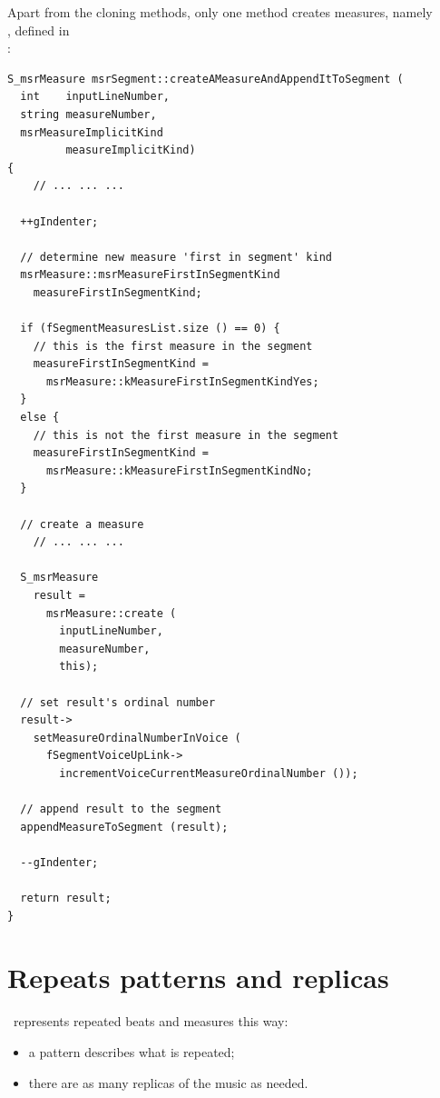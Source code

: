 Apart from the cloning methods, only one method creates measures, namely\\
, defined in\\
:
\begin{lstlisting}[language=CPlusPlus]
S_msrMeasure msrSegment::createAMeasureAndAppendItToSegment (
  int    inputLineNumber,
  string measureNumber,
  msrMeasureImplicitKind
         measureImplicitKind)
{
	// ... ... ...

  ++gIndenter;

  // determine new measure 'first in segment' kind
  msrMeasure::msrMeasureFirstInSegmentKind
    measureFirstInSegmentKind;

  if (fSegmentMeasuresList.size () == 0) {
    // this is the first measure in the segment
    measureFirstInSegmentKind =
      msrMeasure::kMeasureFirstInSegmentKindYes;
  }
  else {
    // this is not the first measure in the segment
    measureFirstInSegmentKind =
      msrMeasure::kMeasureFirstInSegmentKindNo;
  }

  // create a measure
	// ... ... ...

  S_msrMeasure
    result =
      msrMeasure::create (
        inputLineNumber,
        measureNumber,
        this);

  // set result's ordinal number
  result->
    setMeasureOrdinalNumberInVoice (
      fSegmentVoiceUpLink->
        incrementVoiceCurrentMeasureOrdinalNumber ());

  // append result to the segment
  appendMeasureToSegment (result);

  --gIndenter;

  return result;
}
\end{lstlisting}


\section{Repeats patterns and replicas}\label{Repeats patterns and replicas}

\msrRepr\ represents repeated beats and measures this way:
\begin{itemize}
\item a pattern describes what is repeated;
\item there are as many replicas of the music as needed.
\end{itemize}

